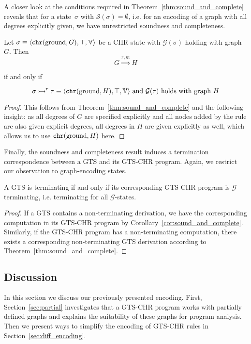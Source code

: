 \documentclass{tlp}
\newcommand{\st}[3]{\ensuremath{\langle #1 , #2 , #3 \rangle}}
\newcommand{\mcG}{\ensuremath{\mathcal{G}}}
\newcommand{\bbV}{\ensuremath{\mathbb{V}}}
\newcommand{\der}{\ensuremath{\rightarrowtail}}
\DeclareMathOperator{\gnd}{ground}
\newcommand{\chr}{\ensuremath{{\tt chr}}}
\newcommand{\strong}{\ensuremath{\mathcal{S}}}
\begin{document}
A closer look at the conditions required in Theorem~\ref{thm:sound_and_complete}
reveals that for a state~$\sigma$ with $\strong(\sigma) = \emptyset$, i.e. for an
encoding of a graph with all degrees explicitly given, we have unrestricted
soundness and completeness.

\begin{corollary}
\label{cor:sound_and_complete}

Let $\sigma \equiv \st{\chr(\gnd,G)}{\top}{\bbV}$ be a CHR state with
$\mcG(\sigma)$ holding with graph~$G$. Then \[ G \stackrel{r,m}{\Longrightarrow}
H\]
\centerline{if and only if}
\[ \sigma \der^r \tau \equiv \st{\chr(\gnd,H)}{\top}{\bbV} \text{ and }
\mcG(\tau) \text{ holds with graph } H\]
\begin{proof}
This follows from Theorem~\ref{thm:sound_and_complete} and the following
insight: as all degrees of $G$ are specified explicitly and all nodes added by
the rule are also given explicit degrees, all degrees in $H$ are given
explicitly as well, which allows us to use $\chr(\gnd,H)$ here.
\end{proof}
\end{corollary}

Finally, the soundness and completeness result induces a termination
correspondence between a GTS and its GTS-CHR program. Again, we restrict our
observation to graph-encoding states.

\begin{corollary}\label{cor:termination} A GTS is
terminating if and only if its corresponding GTS-CHR program is \mcG-terminating,
i.e. terminating for all \mcG-states.
\begin{proof}
If a GTS contains a non-terminating derivation, we have the corresponding
computation in its GTS-CHR program by Corollary~\ref{cor:sound_and_complete}.
Similarly, if the GTS-CHR program has a non-terminating computation, there
exists a corresponding non-terminating GTS derivation according to
Theorem~\ref{thm:sound_and_complete}.
\end{proof}
\end{corollary}

\subsection{Discussion}
\label{sec:encoding_discussion}

In this section we discuss our previously presented encoding. First,
Section~\ref{sec:partial} investigates that a GTS-CHR program works with
partially defined graphs and explains the suitability of these graphs for program
analysis. Then we present ways to simplify the encoding of GTS-CHR rules in
Section~\ref{sec:diff_encoding}.
\end{document}
